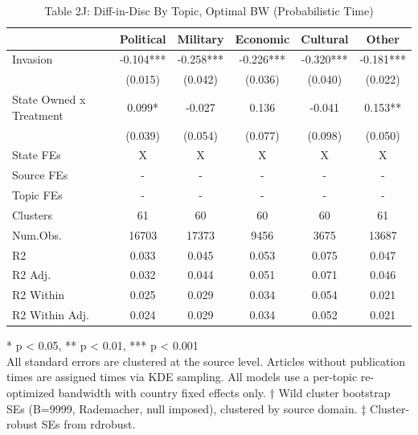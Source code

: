\begin{table}[!t]
\caption{Table 2J: Diff-in-Disc By Topic, Optimal BW (Probabilistic Time)} 
\fontsize{12.0pt}{14.4pt}\selectfont
\begin{tabular*}{\linewidth}{@{\extracolsep{\fill}}lccccc}
\toprule
  & Political & Military & Economic & Cultural & Other \\ 
\midrule\addlinespace[2.5pt]
Invasion & -0.104*** & -0.258*** & -0.226*** & -0.320*** & -0.181*** \\ 
 & (0.015) & (0.042) & (0.036) & (0.040) & (0.022) \\ 
State Owned x Treatment & 0.099* & -0.027 & 0.136 & -0.041 & 0.153** \\ 
{} & {(0.039)} & {(0.054)} & {(0.077)} & {(0.098)} & {(0.050)} \\ 
State FEs & X & X & X & X & X \\ 
Source FEs & - & - & - & - & - \\ 
Topic FEs & - & - & - & - & - \\ 
Clusters & 61 & 60 & 60 & 60 & 61 \\ 
Num.Obs. & 16703 & 17373 & 9456 & 3675 & 13687 \\ 
R2 & 0.033 & 0.045 & 0.053 & 0.075 & 0.047 \\ 
R2 Adj. & 0.032 & 0.044 & 0.051 & 0.071 & 0.046 \\ 
R2 Within & 0.025 & 0.029 & 0.034 & 0.054 & 0.021 \\ 
R2 Within Adj. & 0.024 & 0.029 & 0.034 & 0.052 & 0.021 \\ 
\bottomrule
\end{tabular*}
\begin{minipage}{\linewidth}
* p < 0.05, ** p < 0.01, *** p < 0.001\\
All standard errors are clustered at the source level. Articles without
publication times are assigned times via KDE sampling. All models use a
per-topic re-optimized bandwidth with country fixed effects only. † Wild cluster
bootstrap SEs (B=9999, Rademacher, null imposed), clustered by source domain. ‡
Cluster-robust SEs from rdrobust.\\
\end{minipage}
\end{table}

